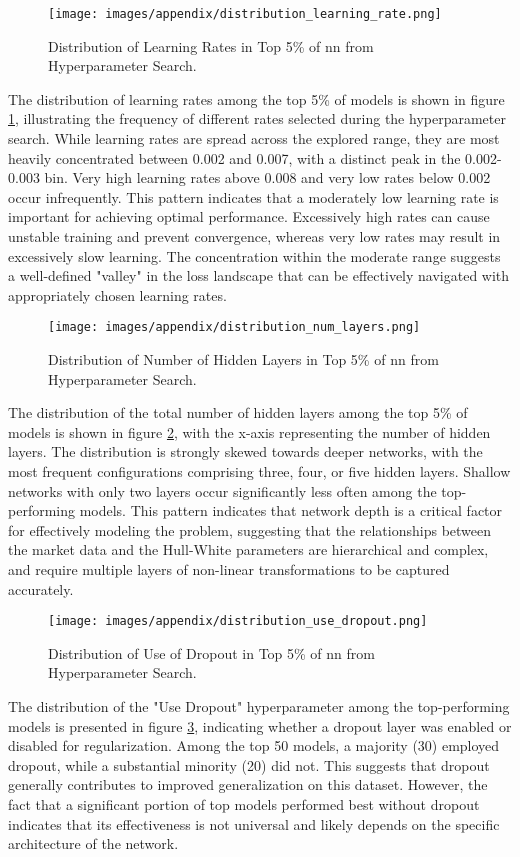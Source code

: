 \begin{figure}[H]
	\centering
	\texttt{[image: images/appendix/distribution\_learning\_rate.png]}
	\caption{Distribution of Learning Rates in Top 5\% of \ac{nn} from Hyperparameter Search.}
	\label{fig:distribution_learning_rate}
\end{figure}
The distribution of learning rates among the top 5\% of models is shown in figure \ref{fig:distribution_learning_rate}, illustrating the frequency of different rates selected during the hyperparameter search. While learning rates are spread across the explored range, they are most heavily concentrated between 0.002 and 0.007, with a distinct peak in the 0.002-0.003 bin. Very high learning rates above 0.008 and very low rates below 0.002 occur infrequently. This pattern indicates that a moderately low learning rate is important for achieving optimal performance. Excessively high rates can cause unstable training and prevent convergence, whereas very low rates may result in excessively slow learning. The concentration within the moderate range suggests a well-defined "valley" in the loss landscape that can be effectively navigated with appropriately chosen learning rates.

\begin{figure}[H]
	\centering
	\texttt{[image: images/appendix/distribution\_num\_layers.png]}
	\caption{Distribution of Number of Hidden Layers in Top 5\% of \ac{nn} from Hyperparameter Search.}
	\label{fig:distribution_num_layers}
\end{figure}
The distribution of the total number of hidden layers among the top 5\% of models is shown in figure \ref{fig:distribution_num_layers}, with the x-axis representing the number of hidden layers. The distribution is strongly skewed towards deeper networks, with the most frequent configurations comprising three, four, or five hidden layers. Shallow networks with only two layers occur significantly less often among the top-performing models. This pattern indicates that network depth is a critical factor for effectively modeling the problem, suggesting that the relationships between the market data and the Hull-White parameters are hierarchical and complex, and require multiple layers of non-linear transformations to be captured accurately.

\begin{figure}[H]
	\centering
	\texttt{[image: images/appendix/distribution\_use\_dropout.png]}
	\caption{Distribution of Use of Dropout in Top 5\% of \ac{nn} from Hyperparameter Search.}
	\label{fig:distribution_use_dropout}
\end{figure}
The distribution of the "Use Dropout" hyperparameter among the top-performing models is presented in figure \ref{fig:distribution_use_dropout}, indicating whether a dropout layer was enabled or disabled for regularization. Among the top 50 models, a majority (30) employed dropout, while a substantial minority (20) did not. This suggests that dropout generally contributes to improved generalization on this dataset. However, the fact that a significant portion of top models performed best without dropout indicates that its effectiveness is not universal and likely depends on the specific architecture of the network.

